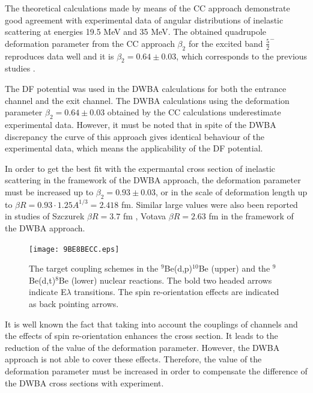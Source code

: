 \documentclass[10pt]{iopart}
\begin{document}
The theoretical calculations made by means of the CC approach demonstrate good agreement with experimental data of angular distributions of inelastic scattering at energies 19.5 MeV and 35 MeV. The obtained quadrupole deformation parameter from the CC approach $\beta_2$ for the excited band $\frac{5}{2}^-$ reproduces data well and it is $\beta_2=0.64\pm0.03$, which corresponds to the previous studies \cite{lukyanov2014, harakeh1980}.

The DF potential was used  in the DWBA calculations for both the entrance channel and the exit channel. 
The DWBA calculations using the deformation parameter $\beta_2=0.64\pm0.03$ obtained by the CC calculations underestimate experimental data. However, it must be noted that in spite of the DWBA discrepancy the curve of this approach gives identical behaviour of the experimental data, which means the applicability of the DF potential. 

In order to get the best fit with the expermantal cross section of inelastic scattering in the framework of the DWBA approach, the deformation parameter must be increased up to $\beta_2=0.93\pm0.03$, or in the scale of deformation length up to $\beta R=0.93\cdot 1.25 A^{1/3}=2.418$ fm. Similar large values were also been reported in studies of Szczurek \etal  $ \beta R=3.7$ fm \cite{bodek1989},  Votava \etal  $\beta R=2.63$ fm \cite{votava1973} in the framework of the DWBA approach.

 
\begin{figure}[bp]
\centering
\texttt{[image: 9BE8BECC.eps]}
\caption{ \label{9BE8BECC} The target coupling schemes in the $^9$Be(d,p)$^{10}$Be (upper) and the $^9$Be(d,t)$^8$Be (lower) nuclear reactions. The bold two headed arrows indicate E$\lambda$ transitions. The spin re-orientation effects are indicated as back pointing arrows.}
\end{figure}	

 It is well known the fact that taking into account the couplings of channels and the effects of spin re-orientation enhances the cross section. It leads to the reduction of the value of the deformation parameter. However, the DWBA approach is not able to cover these effects. Therefore, the value of the deformation parameter must be increased  in order to compensate the difference of the DWBA cross sections with experiment. 

\end{document}
